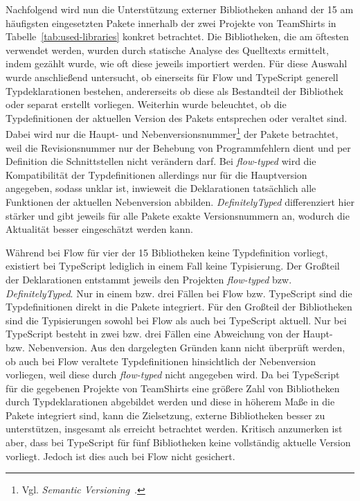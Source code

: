 Nachfolgend wird nun die Unterstützung externer Bibliotheken anhand der 15 am häufigsten eingesetzten Pakete innerhalb der zwei Projekte von TeamShirts in Tabelle~\ref{tab:used-libraries} konkret betrachtet. Die Bibliotheken, die am öftesten verwendet werden, wurden durch statische Analyse des Quelltexts ermittelt, indem gezählt wurde, wie oft diese jeweils importiert werden. Für diese Auswahl wurde anschließend untersucht, ob einerseits für Flow und TypeScript generell Typdeklarationen bestehen, andererseits ob diese als Bestandteil der Bibliothek oder separat erstellt vorliegen. Weiterhin wurde beleuchtet, ob die Typdefinitionen der aktuellen Version des Pakets entsprechen oder veraltet sind. Dabei wird nur die Haupt- und Nebenversionsnummer\footnote{Vgl. \textit{Semantic Versioning}~\autocite{SEMANTIC_VERSIONING}.} der Pakete betrachtet, weil die Revisionsnummer nur der Behebung von Programmfehlern dient und per Definition die Schnittstellen nicht verändern darf. Bei \textit{flow-typed} wird die Kompatibilität der Typdefinitionen allerdings nur für die Hauptversion angegeben, sodass unklar ist, inwieweit die Deklarationen tatsächlich alle Funktionen der aktuellen Nebenversion abbilden. \textit{DefinitelyTyped} differenziert hier stärker und gibt jeweils für alle Pakete exakte Versionsnummern an, wodurch die Aktualität besser eingeschätzt werden kann.



Während bei Flow für vier der 15 Bibliotheken keine Typdefinition vorliegt, existiert bei TypeScript lediglich in einem Fall keine Typisierung. Der Großteil der Deklarationen entstammt jeweils den Projekten \textit{flow-typed} bzw. \textit{DefinitelyTyped}. Nur in einem bzw. drei Fällen bei Flow bzw. TypeScript sind die Typdefinitionen direkt in die Pakete integriert.
Für den Großteil der Bibliotheken sind die Typisierungen sowohl bei Flow als auch bei TypeScript aktuell. Nur bei TypeScript besteht in zwei bzw. drei Fällen eine Abweichung von der Haupt- bzw. Nebenversion. Aus den dargelegten Gründen kann nicht überprüft werden, ob auch bei Flow veraltete Typdefinitionen hinsichtlich der Nebenversion vorliegen, weil diese durch \textit{flow-typed} nicht angegeben wird. Da bei TypeScript für die gegebenen Projekte von TeamShirts eine größere Zahl von Bibliotheken durch Typdeklarationen abgebildet werden und diese in höherem Maße in die Pakete integriert sind, kann die Zielsetzung, externe Bibliotheken besser zu unterstützen, insgesamt als erreicht betrachtet werden. Kritisch anzumerken ist aber, dass bei TypeScript für fünf Bibliotheken keine vollständig aktuelle Version vorliegt. Jedoch ist dies auch bei Flow nicht gesichert.

